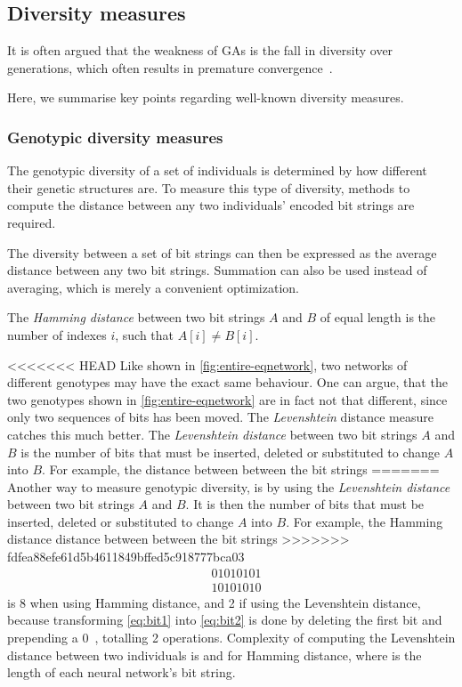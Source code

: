 \subsection{Diversity measures}
\label{sec:diversitymeasures}
It is often argued that the weakness of GAs is the fall in diversity over generations, which often results in premature convergence~\cite{diaz2007empirical, 1266373,Zitzler00comparisonof}.

Here, we summarise key points regarding well-known diversity measures. %

\subsubsection{Genotypic diversity measures}
The genotypic diversity of a set of individuals is determined by how different their genetic structures are. To measure this type of diversity, methods to compute the distance between any two individuals' encoded bit strings are required.

The diversity between a set of bit strings can then be expressed as the average distance between any two bit strings. Summation can also be used instead of averaging, which is merely a convenient optimization.

The \emph{Hamming distance} between two bit strings $A$ and $B$ of equal length is the number of indexes $i$, such that $A[i] \neq B[i]$.

<<<<<<< HEAD
Like shown in \cref{fig:entire-eqnetwork}, two networks of different genotypes may have the exact same behaviour.
One can argue, that the two genotypes shown in \cref{fig:entire-eqnetwork} are in fact not that different, since only two sequences of bits has been moved. 
The \emph{Levenshtein} distance measure catches this much better. The \emph{Levenshtein distance} between two bit strings $A$ and $B$ is the number of bits that must be inserted, deleted or substituted to change $A$ into $B$. For example, the distance between between the bit strings
=======
Another way to measure genotypic diversity, is by using the \emph{Levenshtein distance} between two bit strings $A$ and $B$. It is then the number of bits that must be inserted, deleted or substituted to change $A$ into $B$. For example, the Hamming distance distance between between the bit strings
>>>>>>> fdfea88efe61d5b4611849bffed5c918777bca03
%
\begin{align}
&01010101\label{eq:bit1} \\
&10101010\label{eq:bit2}
\end{align}
%
is 8 when using Hamming distance, and 2 if using the Levenshtein distance, because transforming \cref{eq:bit1} into \cref{eq:bit2} is done by deleting the first bit and prepending a $0$~\cite{1250187}, totalling 2 operations. Complexity of computing the Levenshtein distance between two individuals is  and \bigO{\bitstringl} for Hamming distance, where \bitstringl{} is the length of each neural network's bit string.

